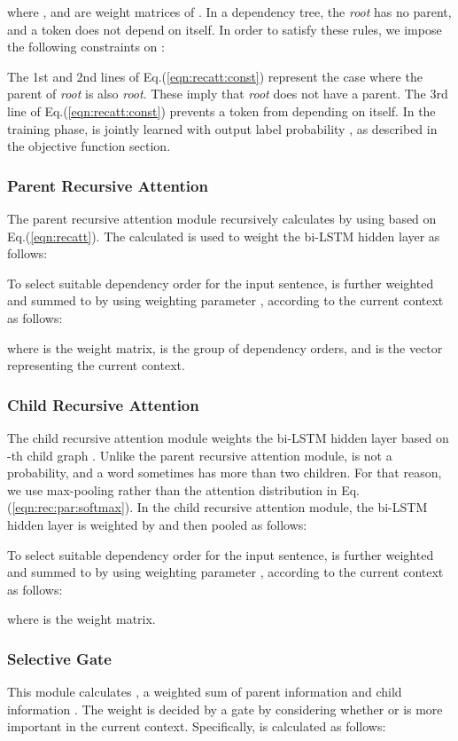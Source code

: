 \documentclass[letterpaper]{article} \usepackage{aaai20}  \usepackage{times}  \usepackage{helvet} \usepackage{courier}  \usepackage[hyphens]{url}  \usepackage{graphicx} \urlstyle{rm} \def\UrlFont{\rm}  \usepackage{graphicx}  \frenchspacing  \setlength{\pdfpagewidth}{8.5in}  \setlength{\pdfpageheight}{11in}  \usepackage{tabu}
\begin{document}
where ,  and  are weight matrices of .
In a dependency tree, the {\it root} has no parent, and a token does not depend on itself.
In order to satisfy these rules, we impose the following constraints on :

The 1st and 2nd lines of Eq.(\ref{eqn:recatt:const}) represent the case where the parent of {\it root} is also {\it root}.
These imply that {\it root} does not have a parent.
The 3rd line of Eq.(\ref{eqn:recatt:const}) prevents a token from depending on itself.
In the training phase,  is jointly learned with output label probability , as described in the objective function section.

\subsubsection{Parent Recursive Attention}

The parent recursive attention module recursively calculates  by using  based on Eq.(\ref{eqn:recatt}).
The calculated  is used to weight the bi-LSTM hidden layer  as follows:


To select suitable dependency order  for the input sentence,  is  further weighted and summed to  by using weighting parameter , according to the current context as follows:

where  is the weight matrix,  is the group of dependency orders, and  is the vector representing the current context.

\subsubsection{Child Recursive Attention}

The child recursive attention module weights the bi-LSTM hidden layer  based on -th child graph .
Unlike the parent recursive attention module,  is not a probability, and a word sometimes has more than two children.
For that reason, we use max-pooling rather than the attention distribution in Eq.(\ref{eqn:rec:par:softmax}).
In the child recursive attention module, the bi-LSTM hidden layer  is weighted by  and then pooled as follows:


To select suitable dependency order  for the input sentence,  is further weighted and summed to  by using weighting parameter , according to the current context as follows:

where  is the weight matrix.

\subsubsection{Selective Gate}
This module calculates , a weighted sum of parent information  and child information . The weight is decided by a gate  by considering whether  or  is more important in the current context.
Specifically,  is calculated as follows:
\end{document}
